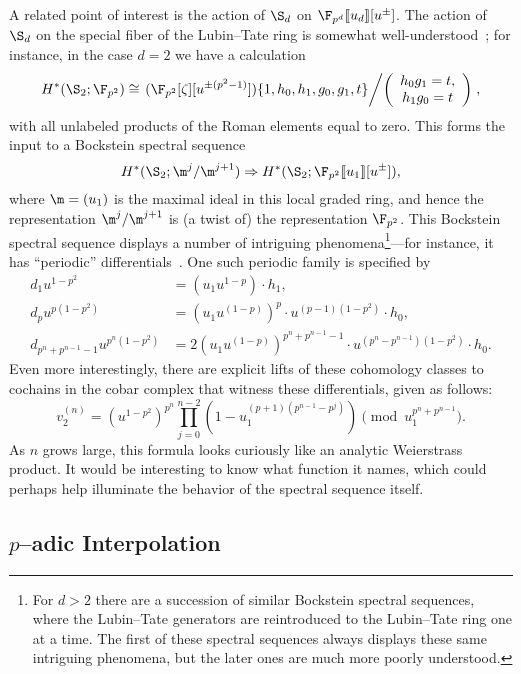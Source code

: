 A related point of interest is the action of \(\S_d\) on \(\F_{p^d}\ps{u_d}[u^\pm]\).  The action of \(\S_d\) on the special fiber of the Lubin--Tate ring is somewhat well-understood~\cite{RavenelCohomologyStabAlgs}; for instance, in the case \(d = 2\) we have a calculation \[H^*(\S_2; \F_{p^2}) \cong \left.(\F_{p^2}[\zeta][u^{\pm(p^2-1)}])\{1, h_0, h_1, g_0, g_1, t\}\middle/\left(\begin{array}{c} h_0 g_1 = t, \\ h_1 g_0 = t \end{array}\right)\right. ,\] with all unlabeled products of the Roman elements equal to zero.  This forms the input to a Bockstein spectral sequence \[H^*(\S_2; \m^j / \m^{j+1}) \Rightarrow H^*(\S_2; \F_{p^2}\ps{u_1}[u^\pm]),\] where \(\m = (u_1)\) is the maximal ideal in this local graded ring, and hence the representation \(\m^j / \m^{j+1}\) is (a twist of) the representation \(\F_{p^2}\).  This Bockstein spectral sequence displays a number of intriguing phenomena\footnote{For \(d > 2\) there are a succession of similar Bockstein spectral sequences, where the Lubin--Tate generators are reintroduced to the Lubin--Tate ring one at a time.  The first of these spectral sequences always displays these same intriguing phenomena, but the later ones are much more poorly understood.}---for instance, it has ``periodic'' differentials~\cite{Sadofsky}.  One such periodic family is specified by
\begin{align*}
d_1 u^{1-p^2} & = (u_1 u^{1-p}) \cdot h_1, \\
d_p u^{p(1-p^2)} & = (u_1 u^{(1-p)})^p \cdot u^{(p-1)(1-p^2)} \cdot h_0, \\
d_{p^n+p^{n-1}-1} u^{p^n(1-p^2)} & = 2 (u_1 u^{(1-p)})^{p^n + p^{n-1} - 1} \cdot u^{(p^n - p^{n-1})(1 - p^2)} \cdot h_0.
\end{align*}
Even more interestingly, there are explicit lifts of these cohomology classes to cochains in the cobar complex that witness these differentials, given as follows: \[v_2^{(n)} = (u^{1-p^2})^{p^n} \prod_{j=0}^{n-2} \left(1 - u_1^{(p+1)(p^{n-1} - p^j)} \right) \pmod{u_1^{p^n + p^{n-1}}}.\]  As \(n\) grows large, this formula looks curiously like an analytic Weierstrass product.  It would be interesting to know what function it names, which could perhaps help illuminate the behavior of the spectral sequence itself.





\subsection*{\(p\)--adic Interpolation}

